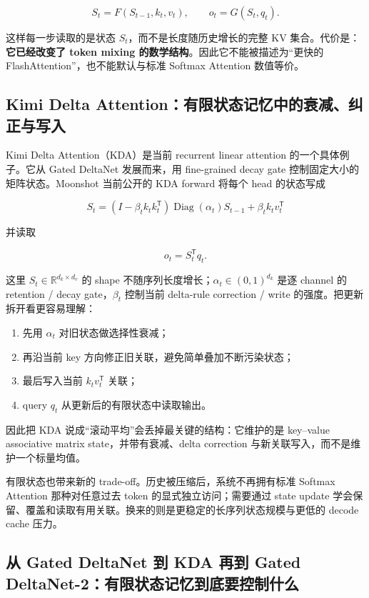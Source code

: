 \documentclass[profile=standard,twoside=false]{ipara-handbook}
\begin{document}
$$
\boxed{
S_t=F(S_{t-1},k_t,v_t),
\qquad
 o_t=G(S_t,q_t)
}.
$$

这样每一步读取的是状态 $S_t$，而不是长度随历史增长的完整 KV 集合。代价是：\textbf{它已经改变了 token mixing 的数学结构}。因此它不能被描述为“更快的 FlashAttention”，也不能默认与标准 Softmax Attention 数值等价。

\subsection{Kimi Delta Attention：有限状态记忆中的衰减、纠正与写入}

Kimi Delta Attention（KDA）是当前 recurrent linear attention 的一个具体例子。它从 Gated DeltaNet 发展而来，用 fine-grained decay gate 控制固定大小的矩阵状态。Moonshot 当前公开的 KDA forward 将每个 head 的状态写成

$$
\boxed{
S_t
=
\left(I-\beta_t k_tk_t^{\mathsf T}\right)
\operatorname{Diag}(\alpha_t)S_{t-1}
+\beta_t k_tv_t^{\mathsf T}
}
$$

并读取

$$
\boxed{o_t=S_t^{\mathsf T}q_t}.
$$

这里 $S_t\in\mathbb{R}^{d_k\times d_v}$ 的 shape 不随序列长度增长；$\alpha_t\in(0,1)^{d_k}$ 是逐 channel 的 retention / decay gate，$\beta_t$ 控制当前 delta-rule correction / write 的强度。把更新拆开看更容易理解：

\begin{enumerate}
  \item 先用 $\alpha_t$ 对旧状态做选择性衰减；
  \item 再沿当前 key 方向修正旧关联，避免简单叠加不断污染状态；
  \item 最后写入当前 $k_t v_t^{\mathsf T}$ 关联；
  \item query $q_t$ 从更新后的有限状态中读取输出。
\end{enumerate}

因此把 KDA 说成“滚动平均”会丢掉最关键的结构：它维护的是 key--value associative matrix state，并带有衰减、delta correction 与新关联写入，而不是维护一个标量均值。

有限状态也带来新的 trade-off。历史被压缩后，系统不再拥有标准 Softmax Attention 那种对任意过去 token 的显式独立访问；需要通过 state update 学会保留、覆盖和读取有用关联。换来的则是更稳定的长序列状态规模与更低的 decode cache 压力。

\subsection{从 Gated DeltaNet 到 KDA 再到 Gated DeltaNet-2：有限状态记忆到底要控制什么}
\end{document}
